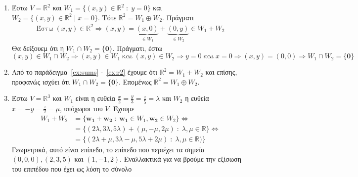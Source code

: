 \begin{examples}\label{ex:directsums}
\item {}
  \begin{enumerate}
    \item Έστω $ V = \mathbb{R}^{2} $ και $ W_{1} = 
      \{(x,y)\in \mathbb{R}^{2} \; : \; y =0 \} $ και 
      $ W_{2} = \{(x,y)\in \mathbb{R}^{2} \mid x=0 \}$. 
      Τότε $ \mathbb{R}^{2} = W_{1} \oplus W_{2} $. Πράγματι
      \begin{gather*} 
        \text{Έστω} \; (x,y) \in \mathbb{R}^{2} 
        \Rightarrow (x,y) = \underbrace{(x,0)}_{\in W_{1}}+
        \underbrace{(0,y)}_{\in W_{2}} \in W_{1} + W_{2} 
      \end{gather*} 
      Θα δείξουεμ ότι η $ W_{1} \cap W_{2} = \{ \mathbf{0} \} $. Πράγματι, έστω 
      \[ (x,y) \in W_{1} \cap W_{2} \Rightarrow (x,y) 
        \in W_{1} \; \text{και} \; (x,y) \in W_{2} \Rightarrow y=0 \; 
        \text{και} \; x=0 \Rightarrow (x,y) = (0,0) 
      \Rightarrow W_{1} \cap W_{2} = \{ \mathbf{0} \} \]
    \item Από το παράδειγμα~\ref{ex:sums} -~\ref{ex:r2} έχουμε ότι 
      $ \mathbb{R}^{2} = W_{1}+W_{2} $ και επίσης, προφανώς ισχύει ότι 
      $ W_{1} \cap W_{2} = \{ \mathbf{0} \} $. 
      Επομένως $ \mathbb{R}^{2} = W_{1} \oplus W_{2} $.
    \item Έστω $ V = \mathbb{R}^{3} $ και $ W_{1} $ είναι η ευθεία $ \frac{x}{2} = 
      \frac{y}{3} = \frac{z}{5} = \lambda$ και $ W_{2} $ η ευθεία $ x = -y = 
      \frac{z}{2} = \mu $, υπόχωροι του $ V $. Έχουμε
      \begin{align*}
        W_{1}+W_{2} 
                &= \{ 
                  \mathbf{w_{1}}+ \mathbf{w_{2}} \; : \; 
                  \mathbf{w_{1}} \in W_{1}, \mathbf{w_{2}} \in W_{2} 
                \} \Leftrightarrow \\
                &= \{ 
                  (2 \lambda, 3 \lambda, 5 \lambda ) + 
                  (\mu, - \mu, 2 \mu) \; : \; \lambda, \mu \in 
                  \mathbb{R} 
                \} \Leftrightarrow   \\ 
                &= \{ 
                  (2 \lambda + \mu, 3 \lambda - \mu, 5 \lambda + 2 
                  \mu) \; : \; \lambda, \mu \in \mathbb{R} ) 
                \} 
      \end{align*}
      Γεωμετρικά, αυτό είναι επίπεδο, το επίπεδο που περιέχει τα σημεία 
      $ (0,0,0), (2,3,5) $ και $ (1,-1,2) $. Εναλλακτικά για να βρούμε την 
      εξίσωση του επιπέδου που έχει ως λύση το σύνολο 

\end{enumerate}
\end{examples}
